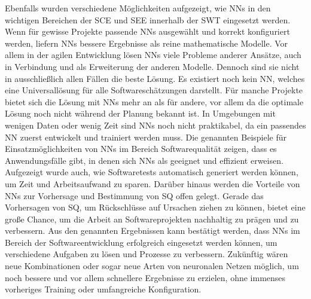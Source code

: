 Ebenfalls wurden verschiedene Möglichkeiten aufgezeigt, wie NNs in den wichtigen Bereichen der SCE und SEE innerhalb der SWT eingesetzt werden. Wenn für gewisse Projekte passende NNs ausgewählt und korrekt konfiguriert werden, liefern NNs bessere Ergebnisse als reine mathematische Modelle. Vor allem in der agilen Entwicklung lösen NNs viele Probleme anderer Ansätze, auch in Verbindung und als Erweiterung der anderen Modelle.
Dennoch sind sie nicht in ausschließlich allen Fällen die beste Lösung. Es existiert noch kein NN, welches eine Universallösung für alle Softwareschätzungen darstellt. Für manche Projekte bietet sich die Lösung mit NNs mehr an als für andere, vor allem da die optimale Lösung noch nicht während der Planung bekannt ist. In Umgebungen mit wenigen Daten oder wenig Zeit sind NNs noch nicht praktikabel, da ein passendes NN zuerst entwickelt und trainiert werden muss.
Die genannten Beispiele für Einsatzmöglichkeiten von NNs im Bereich Softwarequalität zeigen, dass es Anwendungsfälle gibt, in denen sich NNs als geeignet und effizient erweisen. Aufgezeigt wurde auch, wie Softwaretests automatisch generiert werden können, um Zeit und Arbeitsaufwand zu sparen. Darüber hinaus werden die Vorteile von NNs zur Vorhersage und Bestimmung von SQ offen gelegt. Gerade das Vorhersagen von SQ, um Rückschlüsse auf Ursachen ziehen zu können, bietet eine große Chance, um die Arbeit an Softwareprojekten nachhaltig zu prägen und zu verbessern. Aus den genannten Ergebnissen kann bestätigt werden, dass NNs im Bereich der Softwareentwicklung erfolgreich eingesetzt werden können, um verschiedene Aufgaben zu lösen und Prozesse zu verbessern.
Zukünftig wären neue Kombinationen oder sogar neue Arten von neuronalen Netzen möglich, um noch bessere und vor allem schnellere Ergebnisse zu erzielen, ohne immenses vorheriges Training oder umfangreiche Konfiguration.
